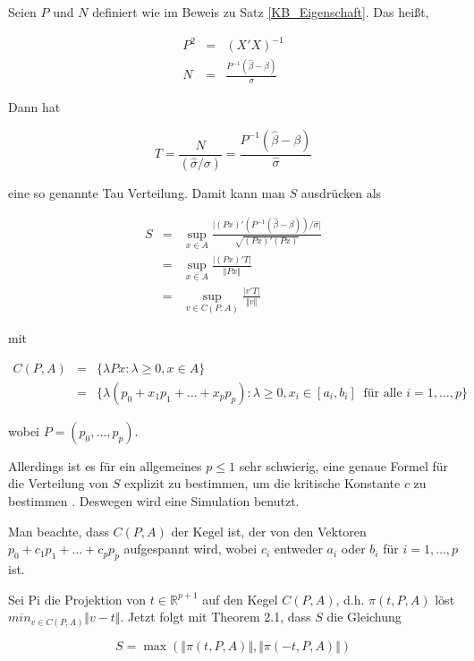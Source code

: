 \documentclass[12pt,a4paper]{article}
\theoremstyle{definition}
\theoremstyle{definition}
\theoremstyle{definition}
\theoremstyle{definition}
\begin{document}
Seien $P$ und $N$ definiert wie im Beweis zu Satz \ref{KB_Eigenschaft}. Das heißt, 

\begin{eqnarray*}
P^2 &=& (X'X)^{-1} \\
N &=& \frac{P^{-1}(\hat{\beta}-\beta)}{\sigma}
\end{eqnarray*}

Dann hat 

\begin{equation*}
T = \frac{N}{(\hat{\sigma} /\sigma)} = \frac{P^{-1}(\hat{\beta}-\beta)}{\hat{\sigma}}
\end{equation*}

eine so genannte \gls{Tau} Verteilung. Damit kann man $S$ ausdrücken als

\begin{eqnarray*}
S &=& \sup_{x \in A} \frac{\vert(Px)'(P^{-1} (\hat{\beta}-\beta)) / \hat{\sigma} \vert}{\sqrt{(Px)'(Px)}}\\
&=& \sup_{x \in A} \frac{\vert (Px)' T \vert}{\Vert Px \Vert} \\
&=& \sup_{v \in C(P,A)} \frac{\vert v'T \vert}{\Vert v \Vert}
\end{eqnarray*}

mit 

\begin{eqnarray*}
C(P,A) &=& \{ \lambda P x : \lambda \geq 0, x \in A \} \\
&=& \{ \lambda (p_0+x_1 p_1 + \ldots +x_p p_p) : \lambda \geq 0, x_i \in [a_i,b_i] ~ \text{ für alle } i=1,\ldots,p \}
\end{eqnarray*}

wobei $P=(p_0, \ldots, p_p)$. 

Allerdings ist es für ein allgemeines $p \leq 1$ sehr schwierig, eine genaue Formel für die Verteilung von $S$ explizit zu bestimmen, um die kritische Konstante $c$ zu bestimmen \cite[S.70, Z.18]{Liu64}. Deswegen wird eine Simulation benutzt.

Man beachte, dass $C(P,A)$ der Kegel ist, der von den Vektoren $p_0+c_1 p_1 + \ldots + c_p p_p $ aufgespannt wird, wobei $c_i$ entweder $a_i$ oder $b_i$ für $i=1,\ldots,p$ ist. 

Sei \gls{Pi} die Projektion von $t \in \mathbb{R}^{p+1}$ auf den Kegel $C(P,A)$, d.h. $\pi(t,P,A)$ löst $ min_{v \in C(P,A)} \Vert v-t \Vert$. Jetzt folgt mit \cite{Naiman87} Theorem 2.1, dass $S$ die Gleichung

\begin{equation*}
S=\max(\Vert \pi(t,P,A) \Vert, \Vert \pi(-t,P,A) \Vert)
\end{equation*}
 
\end{document}
